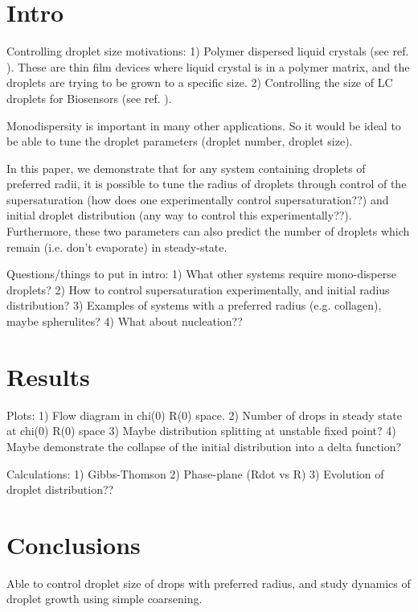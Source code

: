 \documentclass[12pt]{article}
\begin{document}

\section{Intro}
Controlling droplet size motivations:
1) Polymer dispersed liquid crystals (see ref. \cite{ohta:2012gd}). These are thin film devices where liquid crystal is in a polymer matrix, and the droplets are trying to be grown to a specific size.
2) Controlling the size of LC droplets for Biosensors (see ref. \cite{Lee:2016hd}).

Monodispersity is important in many other applications. So it would be ideal to be able to tune the droplet parameters (droplet number, droplet size).

In this paper, we demonstrate that for any system containing droplets of preferred radii, it is possible to tune the radius of droplets through control of the supersaturation (how does one experimentally control supersaturation??) and initial droplet distribution (any way to control this experimentally??). Furthermore, these two parameters can also predict the number of droplets which remain (i.e. don't evaporate) in steady-state.

Questions/things to put in intro:
1) What other systems require mono-disperse droplets?
2) How to control supersaturation experimentally, and initial radius distribution?
3) Examples of systems with a preferred radius (e.g. collagen), maybe spherulites?
4) What about nucleation??

\section{Results}

Plots:
1) Flow diagram in chi(0) R(0) space.
2) Number of drops in steady state at chi(0) R(0) space
3) Maybe distribution splitting at unstable fixed point?
4) Maybe demonstrate the collapse of the initial distribution into a delta function?

Calculations:
1) Gibbs-Thomson
2) Phase-plane (Rdot vs R)
3) Evolution of droplet distribution??

\section{Conclusions}
Able to control droplet size of drops with preferred radius, and study dynamics of droplet growth using simple coarsening.
\clearpage


\end{document}
